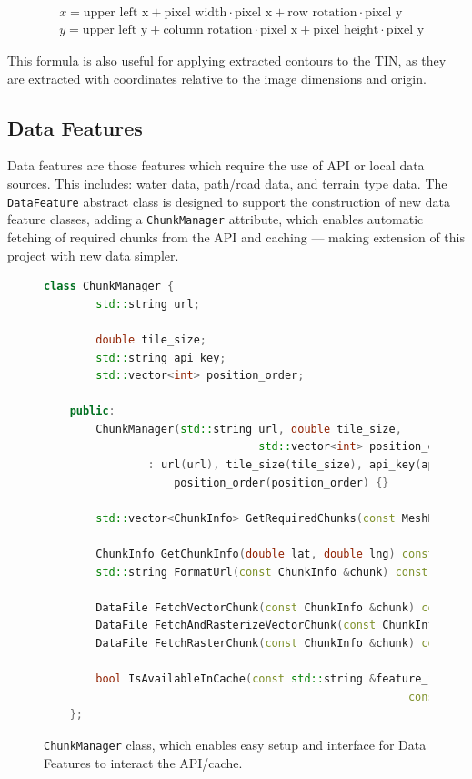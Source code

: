\documentclass[12pt]{article}
\begin{document}
\begin{align}
   & x = \text{upper left x} + \text{pixel width} \cdot \text{pixel x} + \text{row rotation} \cdot \text{pixel y}     \\
   & y = \text{upper left y} + \text{column rotation} \cdot \text{pixel x} + \text{pixel height} \cdot \text{pixel y}
\end{align}

This formula is also useful for applying extracted contours to the TIN, as they are extracted with coordinates relative to the image dimensions and origin.

\subsection{Data Features}

Data features are those features which require the use of API or local data sources. This includes: water data, path/road data, and terrain type data. The \texttt{DataFeature} abstract class is designed to support the construction of new data feature classes, adding a \texttt{ChunkManager} attribute, which enables automatic fetching of required chunks from the API and caching --- making extension of this project with new data simpler.

\begin{figure}[H]
  \centering
  \begin{lstlisting}[language=c++]
	class ChunkManager {
		std::string url;
	
		double tile_size;
		std::string api_key;
		std::vector<int> position_order;
	
	public:
		ChunkManager(std::string url, double tile_size,
								 std::vector<int> position_order, std::string api_key)
				: url(url), tile_size(tile_size), api_key(api_key),
					position_order(position_order) {}

		std::vector<ChunkInfo> GetRequiredChunks(const MeshBoundary &boundary) const;

		ChunkInfo GetChunkInfo(double lat, double lng) const;
		std::string FormatUrl(const ChunkInfo &chunk) const;
	
		DataFile FetchVectorChunk(const ChunkInfo &chunk) const;
		DataFile FetchAndRasterizeVectorChunk(const ChunkInfo &chunk,
		DataFile FetchRasterChunk(const ChunkInfo &chunk) const;

		bool IsAvailableInCache(const std::string &feature_id,
														const ChunkInfo &chunk);
	};
	\end{lstlisting}
  \caption{\texttt{ChunkManager} class, which enables easy setup and interface for Data Features to  interact the API/cache.}
  \label{lst:chunkmanager}
\end{figure}
\end{document}
